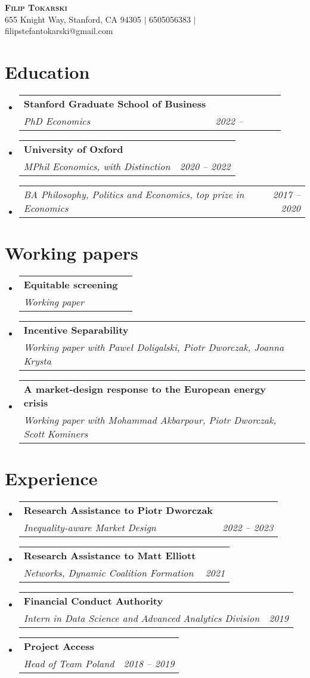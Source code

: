 \documentclass[letterpaper,11pt]{article}
\makeatletter
\newcommand{\resumeSubheading}[3]{
  \vspace{-2pt}\item
    \begin{tabular*}{0.97\textwidth}[t]{l@{\extracolsep{\fill}}r}
      \textbf{#1} \\
      \textit{\small#2} & \textit{\small #3} \\
    \end{tabular*}\vspace{-7pt}
}
\newcommand{\resumeSubSubheading}[2]{
    \item
    \begin{tabular*}{0.97\textwidth}{l@{\extracolsep{\fill}}r}
      \textit{\small#1} & \textit{\small #2} \\
    \end{tabular*}\vspace{-7pt}
}
\newcommand{\resumeSubHeadingListStart}{\begin{itemize}[leftmargin=0.15in, label={}]}
\newcommand{\resumeSubHeadingListEnd}{\end{itemize}}
\makeatother
\begin{document}
\begin{center}
    \textbf{\Huge \scshape Filip Tokarski} \\ \vspace{1pt}
    \small 655 Knight Way, Stanford, CA 94305 $|$
    \small 6505056383 $|$
    \small filipstefantokarski@gmail.com %
\end{center}



\section{Education}
  \resumeSubHeadingListStart
    \resumeSubheading
      {Stanford Graduate School of Business}
      {PhD Economics}{2022 -- \ \ \ \ \ \ }
    \resumeSubHeadingListEnd
  \resumeSubHeadingListStart
    \resumeSubheading
      {University of Oxford}
      {MPhil Economics, with Distinction}{2020 -- 2022}
        \resumeSubSubheading
      {BA Philosophy, Politics and Economics, top prize in Economics}{2017 -- 2020}
  \resumeSubHeadingListEnd

\bigskip



\section{Working papers}
  \resumeSubHeadingListStart
  \resumeSubheading
  {Equitable screening}
  {Working paper}{}
    \resumeSubheading
      {Incentive Separability}
      {Working paper with Pawe\l{} Doligalski, Piotr Dworczak, Joanna Krysta}{}
    \resumeSubheading
      {A market-design response to the European energy crisis}
      {Working paper with Mohammad Akbarpour, Piotr Dworczak, Scott Kominers}{}
  \resumeSubHeadingListEnd

\bigskip




\section{Experience}
  \resumeSubHeadingListStart
      \resumeSubheading
      {Research Assistance to Piotr Dworczak}
      {Inequality-aware Market Design}{2022 -- 2023}
     \resumeSubheading
      {Research Assistance to Matt Elliott}
      {Networks, Dynamic Coalition Formation}{2021}
    \resumeSubheading
      {Financial Conduct Authority}
      {Intern in Data Science and Advanced Analytics Division}{2019}
    \resumeSubheading
      {Project Access}
      {Head of Team Poland}{2018 -- 2019}
  \resumeSubHeadingListEnd
\end{document}
